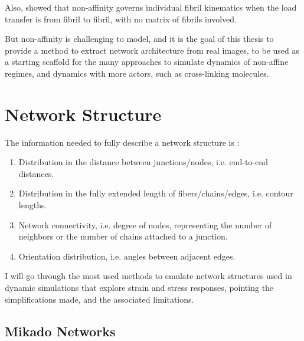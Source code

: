  Also, \citet{chandran_affine_2006}
showed that non-affinity governs individual fibril kinematics when the load
transfer is from fibril to fibril, with no matrix of fibrils involved.

But non-affinity is challenging to model, and it is the goal of this thesis to provide a method to extract network architecture from real images, to be used as a starting scaffold for the many approaches to simulate dynamics of non-affine regimes, and dynamics with more actors, such as cross-linking molecules.

\section{Network Structure}%
\label{sec:network_structure}

The information needed to fully describe a network structure is \cite{palmer_constitutive_2008}:
\begin{enumerate}[topsep=0pt]
  \item Distribution in the distance between junctions/nodes, i.e. end-to-end distances.
  \item Distribution in the fully extended length of fibers/chains/edges, i.e. contour lengths.
  \item Network connectivity, i.e. degree of nodes, representing the number of neighbors or the number of chains attached to a junction.
  \item Orientation distribution, i.e. angles between adjacent edges.
\end{enumerate}

I will go through the most used methods to emulate network structures used in dynamic simulations that explore strain and stress responses, pointing the simplifications made, and the associated limitations.

\subsection{Mikado Networks}%
\label{sub:mikado_networks}

